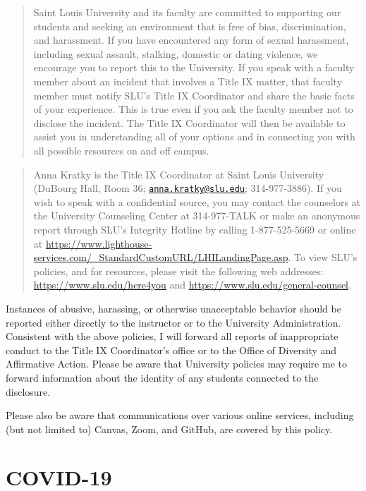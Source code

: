\documentclass[
]{book}
\begin{document}
\begin{quote}
Saint Louis University and its faculty are committed to supporting our students and seeking an environment that is free of bias, discrimination, and harassment. If you have encountered any form of sexual harassment, including sexual assault, stalking, domestic or dating violence, we encourage you to report this to the University. If you speak with a faculty member about an incident that involves a Title IX matter, that faculty member must notify SLU's Title IX Coordinator and share the basic facts of your experience. This is true even if you ask the faculty member not to disclose the incident. The Title IX Coordinator will then be available to assist you in understanding all of your options and in connecting you with all possible resources on and off campus.
\end{quote}

\begin{quote}
Anna Kratky is the Title IX Coordinator at Saint Louis University (DuBourg Hall, Room 36; \href{mailto:anna.kratky@slu.edu}{\nolinkurl{anna.kratky@slu.edu}}; 314-977-3886). If you wish to speak with a confidential source, you may contact the counselors at the University Counseling Center at 314-977-TALK or make an anonymous report through SLU's Integrity Hotline by calling 1-877-525-5669 or online at \url{https://www.lighthouse-services.com/_StandardCustomURL/LHILandingPage.asp}. To view SLU's policies, and for resources, please visit the following web addresses: \url{https://www.slu.edu/here4you} and \url{https://www.slu.edu/general-counsel}.
\end{quote}

Instances of abusive, harassing, or otherwise unacceptable behavior should be reported either directly to the instructor or to the University Administration. Consistent with the above policies, I will forward all reports of inappropriate conduct to the Title IX Coordinator's office or to the Office of Diversity and Affirmative Action. Please be aware that University policies may require me to forward information about the identity of any students connected to the disclosure.

Please also be aware that communications over various online services, including (but not limited to) Canvas, Zoom, and GitHub, are covered by this policy.

\hypertarget{covid-19}{%
\section{COVID-19}\label{covid-19}}
\end{document}
